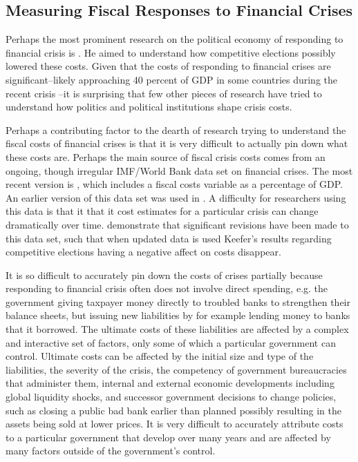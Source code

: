 \documentclass[]{article}
\begin{document}
\subsection*{Measuring Fiscal Responses to Financial Crises}



Perhaps the most prominent research on the political economy of responding to financial crisis is \cite{Keefer2007}. He aimed to understand how competitive elections possibly lowered these costs. Given that the costs of responding to financial crises are significant--likely approaching 40 percent of GDP in some countries during the recent crisis \cite{laeven2013}--it is surprising that few other pieces of research have tried to understand how politics and political institutions shape crisis costs.

Perhaps a contributing factor to the dearth of research trying to understand the fiscal costs of financial crises is that it is very difficult to actually pin down what these costs are. Perhaps the main source of fiscal crisis costs comes from an ongoing, though irregular IMF/World Bank data set on financial crises. The most recent version is \cite{laeven2013}, which includes a fiscal costs variable as a percentage of GDP. An earlier version of this data set was used in \cite{Keefer2007}. A difficulty for researchers using this data is that it that it cost estimates for a particular crisis can change dramatically over time. \cite{GandrudHallerberg2015} demonstrate that significant revisions have been made to this data set, such that when updated data is used Keefer's \citeyearpar{Keefer2007} results regarding competitive elections having a negative affect on costs disappear.

It is so difficult to accurately pin down the costs of crises partially because responding to financial crisis often does not involve direct spending, e.g. the government giving taxpayer money directly to troubled banks to strengthen their balance sheets, but issuing new liabilities by for example lending money to banks that it borrowed. The ultimate costs of these liabilities are affected by a complex and interactive set of factors, only some of which a particular government can control. Ultimate costs can be affected by the initial size and type of the liabilities, the severity of the crisis, the competency of government bureaucracies that administer them, internal and external economic developments including global liquidity shocks, and successor government decisions to change policies, such as closing a public bad bank earlier than planned possibly resulting in the assets being sold at lower prices. It is very difficult to accurately attribute costs to a particular government that develop over many years and are affected by many factors outside of the government's control.
\end{document}
